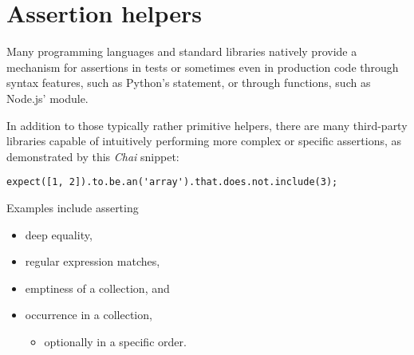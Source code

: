 \section{Assertion helpers}
Many programming languages and standard libraries
natively provide a mechanism for assertions
in tests or sometimes even in production code
through syntax features, such as Python's  statement,
\autocite[Chapter 7.3: The assert statement]{pythonLangRef}
or through functions, such as Node.js'  module.
\autocite[Chapter: Assert]{nodejsDoc}

In addition to those typically rather primitive helpers,
there are many third-party libraries capable of
intuitively performing more complex or specific assertions,
as demonstrated by this \textit{Chai} snippet:
\autocite[Chapter: API Reference --- Language Chains --- .not]{chaiBddDoc}
\begin{verbatim}
expect([1, 2]).to.be.an('array').that.does.not.include(3);
\end{verbatim}
Examples include asserting
\autocite{chaiBddDoc}\autocite{javaHamcrestJavadoc}
\begin{itemize}
  \item deep equality,
  \item regular expression matches,
  \item emptiness of a collection, and
  \item occurrence in a collection,
    \begin{itemize}
      \item optionally in a specific order.
    \end{itemize}
\end{itemize}
